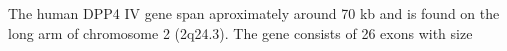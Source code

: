 The human DPP4 IV gene span aproximately around 70 kb and is found on the long arm of chromosome 2 (2q24.3). The gene consists of 26 exons with size 